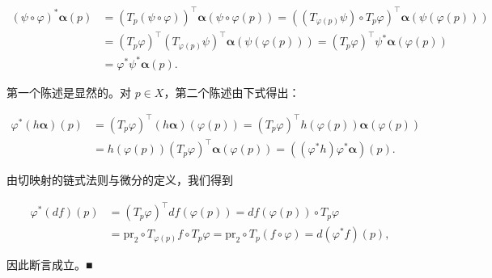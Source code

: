 \begin{proposition}
\begin{subitems}
\begin{equation*}
\begin{aligned}
(\psi\circ\varphi)^{*}\boldsymbol{\alpha}(p) &= (T_{p}(\psi\circ\varphi))^{\top}\boldsymbol{\alpha}(\psi\circ\varphi(p)) = ((T_{\varphi(p)}\psi)\circ T_{p}\varphi)^{\top}\boldsymbol{\alpha}(\psi(\varphi(p))) \\ &= (T_{p}\varphi)^{\top}(T_{\varphi(p)}\psi)^{\top}\boldsymbol{\alpha}(\psi(\varphi(p))) = (T_{p}\varphi)^{\top}\psi^{*}\boldsymbol{\alpha}(\varphi(p)) \\ &= \varphi^{*}\psi^{*}\boldsymbol{\alpha}(p) .
\end{aligned}
\end{equation*}
\end{subitems}

\begin{subitems}
\item[（ii）]

第一个陈述是显然的。对 $ p \in X $，第二个陈述由下式得出：

\begin{equation*}
\begin{aligned}
\varphi^{*}(h\boldsymbol{\alpha})(p) &= (T_{p}\varphi)^{\top}(h\boldsymbol{\alpha})(\varphi(p)) = (T_{p}\varphi)^{\top}h(\varphi(p))\boldsymbol{\alpha}(\varphi(p)) \\ &= h(\varphi(p))(T_{p}\varphi)^{\top}\boldsymbol{\alpha}(\varphi(p)) = ((\varphi^{*}h)\varphi^{*}\boldsymbol{\alpha})(p) .
\end{aligned}
\end{equation*}
\item[（iii）]

由切映射的链式法则与微分的定义，我们得到

\begin{equation*}
\begin{aligned}
\varphi^{*}(df)(p) &= (T_{p}\varphi)^{\top}df(\varphi(p)) = df(\varphi(p))\circ T_{p}\varphi \\ &= \mathrm{pr}_{2}\circ T_{\varphi(p)}f\circ T_{p}\varphi = \mathrm{pr}_{2}\circ T_{p}(f\circ\varphi) = d(\varphi^{*}f)(p) ,
\end{aligned}
\end{equation*}

因此断言成立。\nobreak\hspace{0.35em}■

\end{subitems}

\end{proposition}

